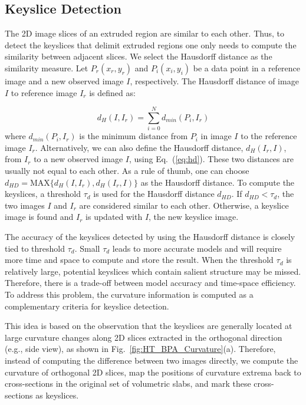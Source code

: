 \documentclass[10pt,twocolumn,letterpaper]{article}
\newcommand{\Eq}[1] {Eq.~(\ref{eq:#1})}
\newcommand{\Figa}[1]{Fig.~\ref{fig:#1}(a)}
\begin{document}
\subsection{Keyslice Detection}
\label{sec:ksd}

The 2D image slices of an extruded region are similar to each other.
Thus, to detect the keyslices that delimit extruded regions one only needs
to compute the similarity between adjacent slices.
We select the Hausdorff distance as the similarity measure.
Let $P_r(x_r, y_r)$ and $P_i(x_i, y_i)$ be a data point in 
a reference image and a new observed image $I$, respectively.
The Hausdorff distance of image $I$ to reference image $I_r$ is defined as:

\begin{equation}
d_H(I, I_r) = \sum_{i=0}^Nd_{min}(P_i, I_r)
\label{eq:hd}
\end{equation}
where $d_{min}(P_i, I_r)$ is the minimum distance from $P_i$ in image $I$
to the reference image $I_r$.
Alternatively, we can also define the Hausdorff distance, $d_H(I_r, I)$,
from $I_r$ to a new observed image $I$, using \Eq{hd}.
These two distances are usually not equal to each other.
As a rule of thumb, one can choose
$d_{HD} = \text{MAX}\{d_H(I, I_r), d_H(I_r, I)\}$ as the Hausdorff distance.
To compute the keyslices, a threshold $\tau_{d}$ is used for the
Hausdorff distance $d_{HD}$.
If $d_{HD} < \tau_{d}$, the two images $I$ and $I_r$ are considered
similar to each other.
Otherwise, a keyslice image is found and $I_r$ is updated with $I$,
the new keyslice image.

The accuracy of the keyslices detected by using the Hausdorff distance
is closely tied to threshold $\tau_d$.
Small $\tau_d$ leads to more accurate models and will require more time and
space to compute and store the result.
When the threshold $\tau_d$ is relatively large, potential keyslices which
contain salient structure may be missed.
Therefore, there is a trade-off between model accuracy and time-space
efficiency.
To address this problem, the curvature information is computed as a
complementary criteria for keyslice detection.

This idea is based on the observation that the keyslices are generally
located at large curvature changes along 2D slices extracted in the orthogonal
direction (e.g., side view), as shown in \Figa{HT_BPA_Curvature}.
Therefore, instead of computing the difference between two images directly,
we compute the curvature of orthogonal 2D slices, map the positions of
curvature extrema back to cross-sections in the original set of volumetric
slabs, and mark these cross-sections as keyslices.
\end{document}
